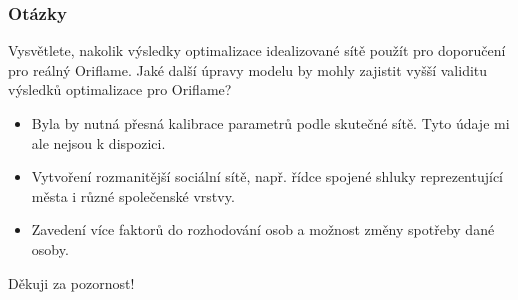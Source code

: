 \documentclass[xcolor=dvipsnames]{beamer}
\begin{document}
  \begin{frame}
    \frametitle{Otázky}
    Vysvětlete, nakolik výsledky optimalizace idealizované sítě použít pro doporučení pro reálný Oriflame. Jaké další úpravy modelu by mohly zajistit vyšší validitu výsledků optimalizace pro Oriflame?\\[1cm]
    \begin{itemize}
    \item Byla by nutná přesná kalibrace parametrů podle skutečné sítě. Tyto údaje mi ale nejsou k dispozici.
    \item Vytvoření rozmanitější sociální sítě, např. řídce spojené shluky reprezentující města i různé společenské vrstvy.
    \item Zavedení více faktorů do rozhodování osob a možnost změny spotřeby dané osoby.
    \end{itemize}
  \end{frame}
  \begin{frame}
    \begin{center}Děkuji za pozornost!\end{center}
  \end{frame}
      
\end{document}
